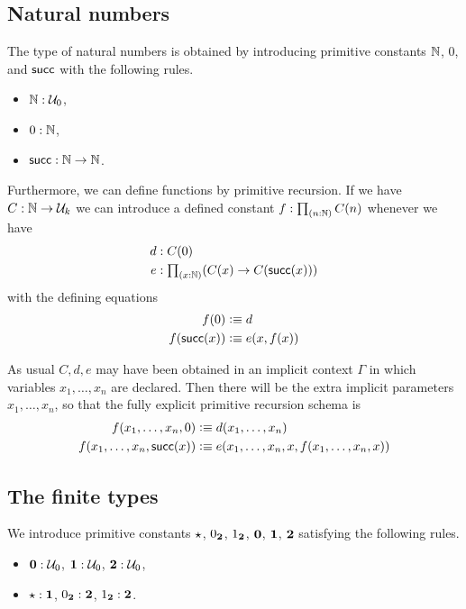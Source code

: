 \subsection{Natural numbers}

The type of natural numbers is obtained by introducing primitive constants
$\mathbb{N}$, $0$, and $\mathsf{succ}$ with the following rules.
\begin{itemize}
  \item $\mathbb{N} : \mathcal{U}_0$,
  \item $0:\mathbb{N}$,
  \item $\mathsf{succ}:\mathbb{N}\rightarrow \mathbb{N}$.
\end{itemize}

Furthermore, we can define functions by primitive recursion.  If we have
$C : \mathbb{N} \rightarrow \mathcal{U}_k $ we can introduce a defined constant $f:\tprd{n:\N}C(n)$ whenever we have
  \begin{align*}
    d & : C(0) \\
    e & : \tprd{x:\N}(C(x)\rightarrow C(\suc (x)))
  \end{align*}
with the defining equations
  \begin{align*}
    f(0) & \vcentcolon\equiv d \\
    f(\mathsf{succ} (x)) & \vcentcolon\equiv e(x,f(x))
  \end{align*}
 
As usual $C,d,e$ may have been obtained in an implicit context $\Gamma$ in which variables $x_1,\ldots,x_n$ are declared.  Then there will be the extra implicit parameters $x_1,\ldots,x_n$, so that the fully explicit primitive recursion schema is
  \begin{align*}
    f(x_1,\dots,x_n,0) & \vcentcolon\equiv d(x_1,\dots,x_n) \\
    f(x_1,\dots,x_n,\mathsf{succ} (x)) & \vcentcolon\equiv e(x_1,\dots,x_n,x,f(x_1,\dots,x_n,x))
  \end{align*}

\subsection{The finite types}

We introduce primitive constants $\star$, ${0_{\mathbf{2}}}$, ${1_{\mathbf{2}}}$, $\mathbf{0}$,
$\mathbf{1}$, $\mathbf{2}$ satisfying the following rules.

\begin{itemize}
\item $\mathbf{0} : \mathcal{U}_0$, $\mathbf{1} : \mathcal{U}_0$, $\mathbf{2} : \mathcal{U}_0$,
\item $\star:\mathbf{1}$, ${0_{\mathbf{2}}}:\mathbf{2}$, ${1_{\mathbf{2}}}:\mathbf{2}$.
\end{itemize}

